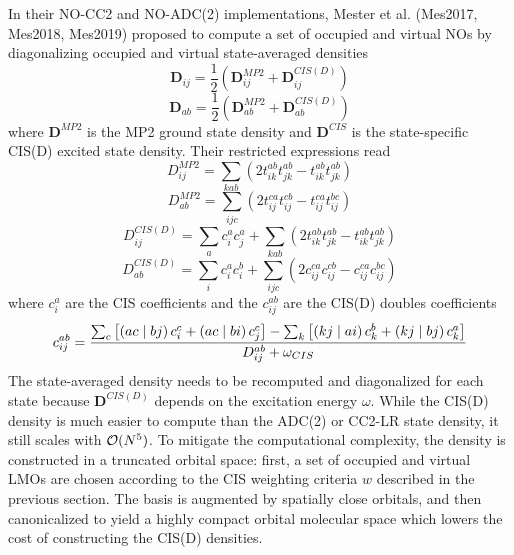 In their NO-CC2 and NO-ADC(2) implementations, Mester et al. (Mes2017, Mes2018, Mes2019) proposed to compute a set of occupied and virtual NOs by diagonalizing occupied and virtual state-averaged densities
\begin{equation}
\mathbf{D}_{ij} = \frac{1}{2} \left( \mathbf{D}_{ij}^{MP2} + \mathbf{D}_{ij}^{CIS(D)} \right)
\end{equation}
\begin{equation}
\mathbf{D}_{ab} = \frac{1}{2} \left( \mathbf{D}_{ab}^{MP2} + \mathbf{D}_{ab}^{CIS(D)} \right)
\end{equation}
\noindent where $\mathbf{D}^{MP2}$ is the MP2 ground state density and $\mathbf{D}^{CIS}$ is the state-specific CIS(D) excited state density. Their restricted expressions read
\begin{equation}
D_{ij}^{MP2} = \sum_{kab} \left( 2 t_{ik}^{ab} t_{jk}^{ab} - t_{ik}^{ab} t_{jk}^{ab} \right) 
\end{equation}
\begin{equation}
D_{ab}^{MP2} = \sum_{ijc} \left( 2t_{ij}^{ca} t_{ij}^{cb} - t_{ij}^{ca}t_{ij}^{bc} \right)
\end{equation}
\begin{equation}
D_{ij}^{CIS(D)} = \sum_{a} c_i^a c_j^a  + \sum_{kab} \left( 2 t_{ik}^{ab} t_{jk}^{ab} - t_{ik}^{ab} t_{jk}^{ab} \right) 
\end{equation}
\begin{equation}
D_{ab}^{CIS(D)} = \sum_{i} c_i^a c_i^b + \sum_{ijc} \left( 2c_{ij}^{ca} c_{ij}^{cb} - c_{ij}^{ca}c_{ij}^{bc} \right)
\end{equation}
\noindent where $c_i^a$ are the CIS coefficients and the $c_{ij}^{ab}$ are the CIS(D) doubles coefficients
\begin{equation}
c_{ij}^{ab} = \frac{\sum_c \left[ \left( ac \mid bj \right) c_i^c + \left( ac \mid bi \right) c_j^c \right] - \sum_k \left[ \left( kj \mid ai \right) c_k^b + \left( kj \mid bj \right) c_k^a \right]}{D_{ij}^{ab} + \omega_{CIS}}
\end{equation}
\noindent The state-averaged density needs to be recomputed and diagonalized for each state because $\mathbf{D}^{CIS(D)}$ depends on the excitation energy $\omega$. While the CIS(D) density is much easier to compute than the ADC(2) or CC2-LR state density, it still scales with $\mathcal{O}(N^{5})$. To mitigate the computational complexity, the density is constructed in a truncated orbital space: first, a set of occupied and virtual LMOs are chosen according to the CIS weighting criteria $w$ described in the previous section. The basis is augmented by spatially close orbitals, and then canonicalized to yield a highly compact orbital molecular space which lowers the cost of constructing the CIS(D) densities. 

